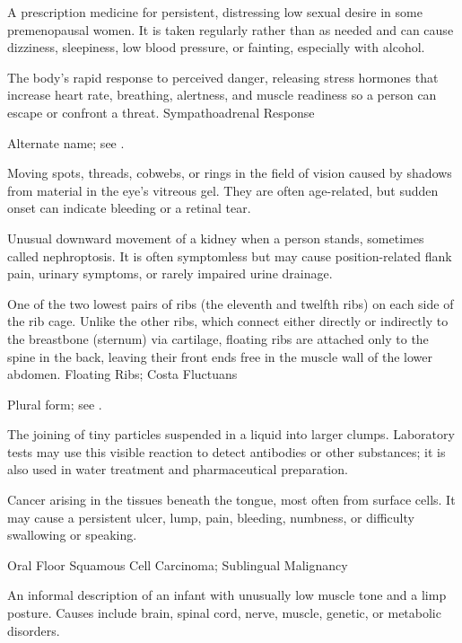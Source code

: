  A prescription medicine for persistent, distressing low sexual desire in some premenopausal women. It is taken regularly rather than as needed and can cause dizziness, sleepiness, low blood pressure, or fainting, especially with alcohol.

 The body’s rapid response to perceived danger, releasing stress hormones that increase heart rate, breathing, alertness, and muscle readiness so a person can escape or confront a threat.
\synonyms
Sympathoadrenal Response

 Alternate name; see .

 Moving spots, threads, cobwebs, or rings in the field of vision caused by shadows from material in the eye’s vitreous gel. They are often age-related, but sudden onset can indicate bleeding or a retinal tear.

 Unusual downward movement of a kidney when a person stands, sometimes called nephroptosis. It is often symptomless but may cause position-related flank pain, urinary symptoms, or rarely impaired urine drainage.

 One of the two lowest pairs of ribs (the eleventh and twelfth ribs) on each side of the rib cage. Unlike the other ribs, which connect either directly or indirectly to the breastbone (sternum) via cartilage, floating ribs are attached only to the spine in the back, leaving their front ends free in the muscle wall of the lower abdomen.
\synonyms
Floating Ribs; Costa Fluctuans

 Plural form; see .

 The joining of tiny particles suspended in a liquid into larger clumps. Laboratory tests may use this visible reaction to detect antibodies or other substances; it is also used in water treatment and pharmaceutical preparation.

 Cancer arising in the tissues beneath the tongue, most often from surface cells. It may cause a persistent ulcer, lump, pain, bleeding, numbness, or difficulty swallowing or speaking.

\synonyms
Oral Floor Squamous Cell Carcinoma; Sublingual Malignancy

 An informal description of an infant with unusually low muscle tone and a limp posture. Causes include brain, spinal cord, nerve, muscle, genetic, or metabolic disorders.

